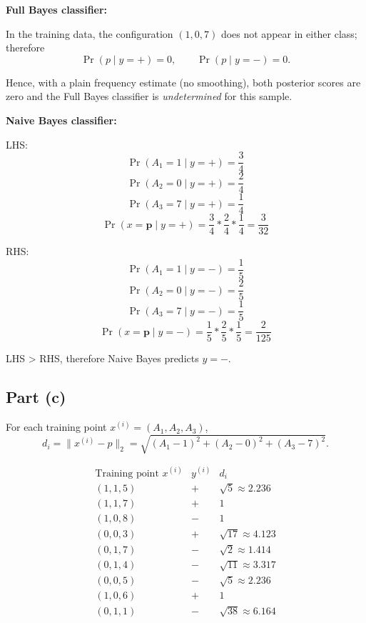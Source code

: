 \documentclass[fleqn]{article}
\begin{document}
    \medskip
    \noindent\textbf{Full Bayes classifier:}

    \medskip
    \noindent In the training data, the configuration $(1,0,7)$ does not appear in either class; therefore
    \[
    \Pr(p\mid y=+)=0,\qquad \Pr(p\mid y=-)=0.
    \]
    
    \noindent Hence, with a plain frequency estimate (no smoothing), both posterior scores are zero and the Full Bayes classifier is \emph{undetermined} for this sample.

    \newpage
    \noindent\textbf{Naive Bayes classifier:}

    \medskip
    LHS:
    \noindent \[
    \Pr(A_{1}=1\mid y=+) = \frac{3}{4}
    \]
    \[
    \Pr(A_{2}=0\mid y=+) = \frac{2}{4}
    \]
    \[
    \Pr(A_{3}=7\mid y=+) = \frac{1}{4}
    \]
    \[
    \Pr(x=\bm{p}\mid y=+) = \frac{3}{4} * \frac{2}{4} * \frac{1}{4} = \frac{3}{32} 
    \]

    \medskip
    RHS:
    \noindent \[
    \Pr(A_{1}=1\mid y=-) = \frac{1}{5}
    \]
    \[
    \Pr(A_{2}=0\mid y=-) = \frac{2}{5}
    \]
    \[
    \Pr(A_{3}=7\mid y=-) = \frac{1}{5}
    \]
    \[
    \Pr(x=\bm{p}\mid y=-) = \frac{1}{5} * \frac{2}{5} * \frac{1}{5} = \frac{2}{125}
    \]

    LHS > RHS, therefore Naive Bayes predicts $y=-$.

    \subsection{Part (c)}

    \noindent For each training point $x^{(i)}=(A_1,A_2,A_3)$,
    \[
    d_i=\|x^{(i)}-p\|_2=\sqrt{(A_1-1)^2+(A_2-0)^2+(A_3-7)^2}.
    \]

    \[
    \begin{array}{c|c|c}
        \text{Training point }x^{(i)} & y^{(i)} & d_i \\
        \hline
        (1,1,5) & + & \sqrt{5}\approx 2.236\\
        (1,1,7) & + & 1\\
        (1,0,8) & - & 1\\
        (0,0,3) & + & \sqrt{17}\approx 4.123\\
        (0,1,7) & - & \sqrt{2}\approx 1.414\\
        (0,1,4) & - & \sqrt{11}\approx 3.317\\
        (0,0,5) & - & \sqrt{5}\approx 2.236\\
        (1,0,6) & + & 1\\
        (0,1,1) & - & \sqrt{38}\approx 6.164
    \end{array}
    \]
    
\end{document}
